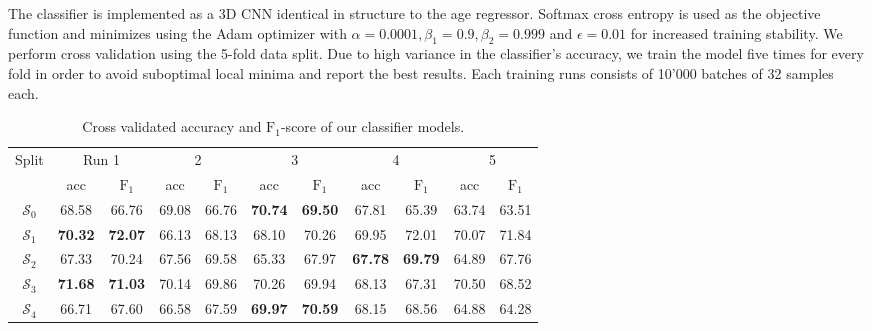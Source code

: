 The classifier is implemented as a 3D CNN identical in structure to the age regressor. Softmax cross entropy is used as the objective function and minimizes using the Adam optimizer with $\alpha = 0.0001, \beta_1 = 0.9, \beta_2 = 0.999$ and $\epsilon = 0.01$ for increased training stability.
We perform cross validation using the 5-fold data split. Due to high variance in the classifier's accuracy, we train the model five times for every fold in order to avoid suboptimal local minima and report the best results. Each training runs consists of 10'000 batches of 32 samples each.

\begin{table}[h]
	\begin{center}
		\begin{tabular}{c c c c c c c c c c c}
			\toprule
			\multirow{2}{*}{Split} & 
			\multicolumn{2}{c}{Run 1} & 
			\multicolumn{2}{c}{2} & 
			\multicolumn{2}{c}{3} & 
			\multicolumn{2}{c}{4} & 
			\multicolumn{2}{c}{5} \\
			\cmidrule(lr){2-3}
			\cmidrule(lr){4-5}
			\cmidrule(lr){6-7}
			\cmidrule(lr){8-9}
			\cmidrule(lr){10-11}
			 & acc & $\text{F}_1$ & acc & $\text{F}_1$ & acc & $\text{F}_1$ & acc & $\text{F}_1$ & acc & $\text{F}_1$ \\ 
			\cmidrule(lr){1-11}
			$\mathcal{S}_0$ & 68.58 & 66.76 & 69.08 & 66.76 & \textbf{70.74} & \textbf{69.50} & 67.81 & 65.39 & 63.74 & 63.51 \\
			$\mathcal{S}_1$ & \textbf{70.32} & \textbf{72.07} & 66.13 & 68.13 & 68.10 & 70.26 & 69.95 & 72.01 & 70.07 & 71.84 \\
			$\mathcal{S}_2$ & 67.33 & 70.24 & 67.56 & 69.58 & 65.33 & 67.97 & \textbf{67.78} & \textbf{69.79} & 64.89 & 67.76 \\
			$\mathcal{S}_3$ & \textbf{71.68} & \textbf{71.03} & 70.14 & 69.86 & 70.26 & 69.94 & 68.13 & 67.31 & 70.50 & 68.52 \\
			$\mathcal{S}_4$ & 66.71 & 67.60 & 66.58 & 67.59 & \textbf{69.97} & \textbf{70.59} & 68.15 & 68.56 & 64.88 & 64.28 \\
			\bottomrule
		\end{tabular}
		\caption{Cross validated accuracy and $\text{F}_1$-score of our classifier models.}
		\label{tab:clfcrossval}
	\end{center}
\end{table} %

